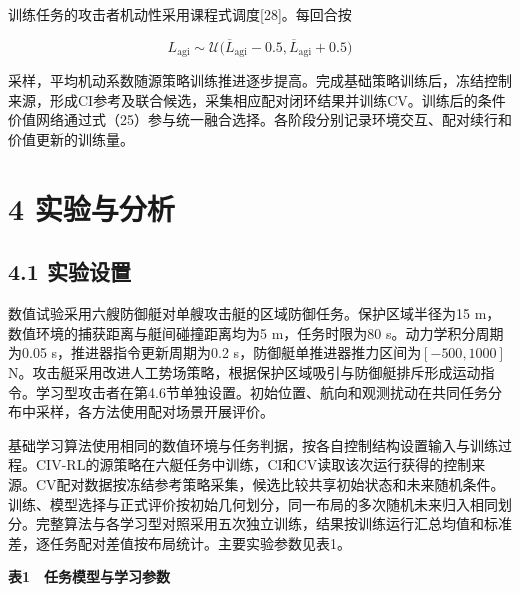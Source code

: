 \documentclass[
  11pt,
  fontset=none]{ctexart}
\begin{document}
训练任务的攻击者机动性采用课程式调度{[}28{]}。每回合按

\[
L_{\mathrm{agi}}
\sim\mathcal U\bigl(\overline L_{\mathrm{agi}}-0.5,
\overline L_{\mathrm{agi}}+0.5\bigr)
\tag{30}
\]

采样，平均机动系数随源策略训练推进逐步提高。完成基础策略训练后，冻结控制来源，形成CI参考及联合候选，采集相应配对闭环结果并训练CV。训练后的条件价值网络通过式（25）参与统一融合选择。各阶段分别记录环境交互、配对续行和价值更新的训练量。

\section{4 实验与分析}\label{ux5b9eux9a8cux4e0eux5206ux6790}

\subsection{4.1 实验设置}\label{ux5b9eux9a8cux8bbeux7f6e}

数值试验采用六艘防御艇对单艘攻击艇的区域防御任务。保护区域半径为15
m，数值环境的捕获距离与艇间碰撞距离均为5 m，任务时限为80
s。动力学积分周期为0.05 s，推进器指令更新周期为0.2
s，防御艇单推进器推力区间为\([-500,1000]\)
N。攻击艇采用改进人工势场策略，根据保护区域吸引与防御艇排斥形成运动指令。学习型攻击者在第4.6节单独设置。初始位置、航向和观测扰动在共同任务分布中采样，各方法使用配对场景开展评价。

基础学习算法使用相同的数值环境与任务判据，按各自控制结构设置输入与训练过程。CIV-RL的源策略在六艇任务中训练，CI和CV读取该次运行获得的控制来源。CV配对数据按冻结参考策略采集，候选比较共享初始状态和未来随机条件。训练、模型选择与正式评价按初始几何划分，同一布局的多次随机未来归入相同划分。完整算法与各学习型对照采用五次独立训练，结果按训练运行汇总均值和标准差，逐任务配对差值按布局统计。主要实验参数见表1。

\textbf{表1　任务模型与学习参数}
\end{document}

